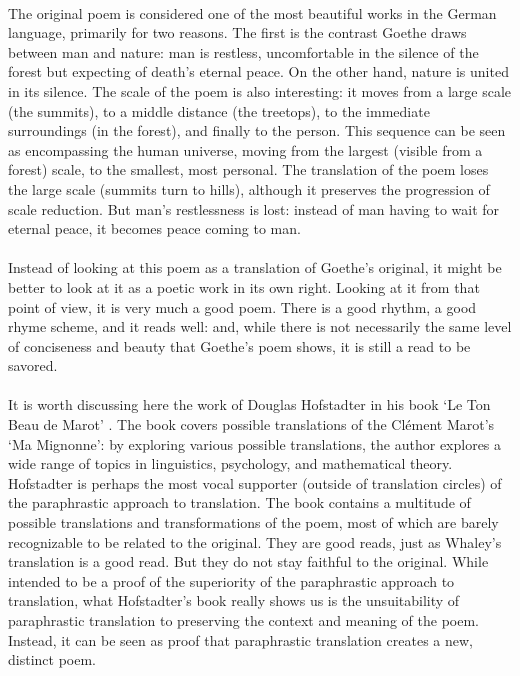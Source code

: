 \paragraph{}{The original poem is considered one of the most beautiful
  works in the German language, primarily for two reasons. The first
  is the contrast Goethe draws between man and nature: man is
  restless, uncomfortable in the silence of the forest but expecting
  of death's eternal peace. On the other hand, nature is united in its
  silence. The scale of the poem is also interesting: it moves from a
  large scale (the summits), to a middle distance (the treetops), to
  the immediate surroundings (in the forest), and finally to the
  person. This sequence can be seen as encompassing the human
  universe, moving from the largest (visible from a forest) scale, to
  the smallest, most personal. The translation of the poem loses the
  large scale (summits turn to hills), although it preserves the progression
  of scale reduction. But man's restlessness is lost: instead of man
  having to wait for eternal peace, it becomes peace coming to man.}
\paragraph{}{Instead of looking at this poem as a translation of
  Goethe's original, it might be better to look at it as a poetic work
  in its own right. Looking at it from that point of view, it is very
  much a good poem. There is a good rhythm, a good rhyme scheme, and
  it reads well: and, while there is not necessarily the same level of
  conciseness and beauty that Goethe's poem shows, it is still a read
  to be savored.}
\paragraph{}{It is worth discussing here the work of Douglas
  Hofstadter in his book `Le Ton Beau de Marot' \cite{hof}. The book
  covers possible translations of the Cl\'{e}ment Marot's `Ma
  Mignonne': by exploring various possible translations, the author
  explores a wide range of topics in linguistics, psychology, and
  mathematical theory. Hofstadter is perhaps the most vocal supporter
  (outside of translation circles) of the paraphrastic approach to
  translation. The book contains a multitude of possible translations
  and transformations of the poem, most of which are barely
  recognizable to be related to the original. They are good reads,
  just as Whaley's translation is a good read. But they do not stay
  faithful to the original. While intended to be a proof of the
  superiority of the paraphrastic approach to translation, what
  Hofstadter's book really shows us is the unsuitability of
  paraphrastic translation to preserving the context and meaning of
  the poem. Instead, it can be seen as proof that paraphrastic
  translation creates a new, distinct poem.  }

